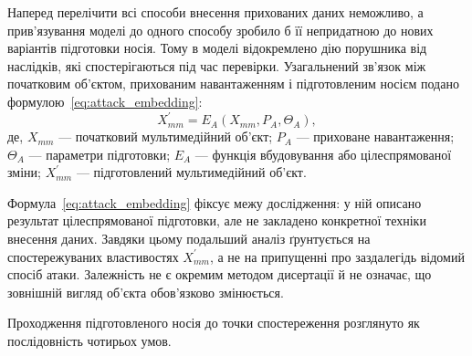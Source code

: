 Наперед перелічити всі способи внесення прихованих даних неможливо, а прив’язування моделі до одного способу зробило б її непридатною до нових варіантів підготовки носія. Тому в моделі відокремлено дію порушника від наслідків, які спостерігаються під час перевірки. Узагальнений зв’язок між початковим об’єктом, прихованим навантаженням і підготовленим носієм подано формулою~\eqref{eq:attack_embedding}:
\begin{equation}
X_{mm}^{\prime}=E_A(X_{mm},P_A,\Theta_A),
\label{eq:attack_embedding}
\end{equation}
де, $X_{mm}$ --- початковий мультимедійний об’єкт; $P_A$ --- приховане навантаження; $\Theta_A$ --- параметри підготовки; $E_A$ --- функція вбудовування або цілеспрямованої зміни; $X_{mm}^{\prime}$ --- підготовлений мультимедійний об’єкт.

Формула~\eqref{eq:attack_embedding} фіксує межу дослідження: у ній описано результат цілеспрямованої підготовки, але не закладено конкретної техніки внесення даних. Завдяки цьому подальший аналіз ґрунтується на спостережуваних властивостях $X_{mm}^{\prime}$, а не на припущенні про заздалегідь відомий спосіб атаки. Залежність не є окремим методом дисертації й не означає, що зовнішній вигляд об’єкта обов’язково змінюється.

Проходження підготовленого носія до точки спостереження розглянуто як послідовність чотирьох умов.

